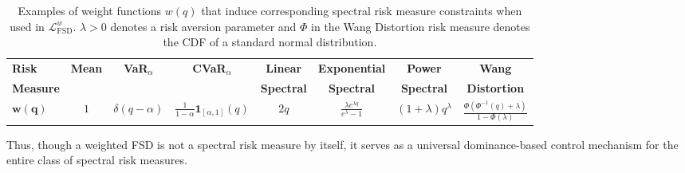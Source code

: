 \begin{table}[t]
  \centering
  \small







  {\footnotesize
    \begin{tabular}{l c c c c c c c}
      \hline
      \textbf{Risk} & \textbf{Mean} & \textbf{VaR$_\alpha$} & \textbf{CVaR$_\alpha$} & \textbf{Linear} & \textbf{Exponential} & \textbf{Power} & \textbf{Wang} \\
      \textbf{Measure}
      &
      & \textbf{}
      & \textbf{}
      & \textbf{Spectral}
      & \textbf{Spectral}
      & \textbf{Spectral}
      & \textbf{Distortion}
      \\
      \hline

      \textbf{$\mathbf{w(q)}$}
      & $1$
      & $\delta(q-\alpha)$
      & $\frac{1}{1-\alpha}\mathbf{1}_{[\alpha,1]}(q)$
      & $2q$
      & $\frac{\lambda e^{\lambda q}}{e^\lambda - 1}$
      & $(1+\lambda) q^\lambda$
      & $\frac{\Phi(\Phi^{-1}(q)+\lambda)}{1-\Phi(\lambda)}$
      \\
      \hline
    \end{tabular}
  }
  \caption{Examples of weight functions $w(q)$ that induce corresponding spectral risk measure constraints when used in $\mathcal{L}_{\mathrm{FSD}}^{w}$. $\lambda > 0$ denotes a risk aversion parameter and $\Phi$ in the Wang Distortion \citep{wang1996premium} risk measure denotes the CDF of a standard normal distribution.}
  \label{tab:spectral_weights}
\end{table}
Thus, though a weighted FSD is not a spectral risk measure by itself, it serves as a universal dominance-based control mechanism for the entire class of spectral risk measures.

